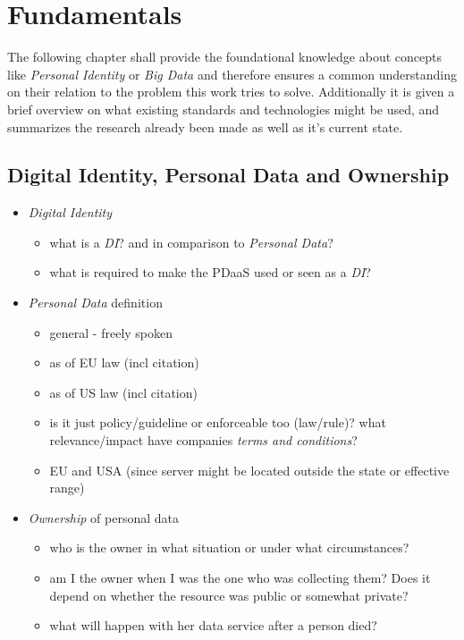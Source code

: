 \documentclass[12pt,english,a4paper,titlepage,cleardoublepage=empty,dottedtoc]{report}
\providecommand{\tightlist}{%
  \setlength{\itemsep}{0pt}\setlength{\parskip}{0pt}}
\begin{document}
\chapter{Fundamentals}\label{fundamentals}

The following chapter shall provide the foundational knowledge about
concepts like \emph{Personal Identity} or \emph{Big Data} and therefore
ensures a common understanding on their relation to the problem this
work tries to solve. Additionally it is given a brief overview on what
existing standards and technologies might be used, and summarizes the
research already been made as well as it's current state.

\hypertarget{digital-identity-personal-data-and-ownership}{\section{Digital
Identity, Personal Data and
Ownership}\label{digital-identity-personal-data-and-ownership}}

\begin{itemize}
\tightlist
\item
  \emph{Digital Identity}

  \begin{itemize}
  \tightlist
  \item
    what is a \emph{DI}? and in comparison to \emph{Personal Data}?
  \item
    what is required to make the PDaaS used or seen as a \emph{DI}?
  \end{itemize}
\item
  \emph{Personal Data} definition

  \begin{itemize}
  \tightlist
  \item
    general - freely spoken
  \item
    as of EU law (incl citation)
  \item
    as of US law (incl citation)
  \item
    is it just policy/guideline or enforceable too (law/rule)? what
    relevance/impact have companies \emph{terms and conditions}?
  \item
    EU and USA (since server might be located outside the state or
    effective range)
  \end{itemize}
\item
  \emph{Ownership} of personal data

  \begin{itemize}
  \tightlist
  \item
    who is the owner in what situation or under what circumstances?
  \item
    am I the owner when I was the one who was collecting them? Does it
    depend on whether the resource was public or somewhat private?
  \item
    what will happen with her data service after a person died?
  \end{itemize}
\end{itemize}
\end{document}
